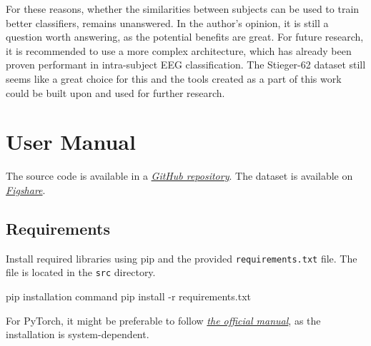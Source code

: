 \documentclass[english, he, bc, kiv, iso690alph, viewonly]{fasthesis}
\begin{document}
For these reasons, whether the similarities between subjects can be used to train better classifiers, remains unanswered. In the author's opinion, it is still a question worth answering, as the potential benefits are great. For future research, it is recommended to use a more complex architecture, which has already been proven performant in intra-subject EEG classification. The Stieger-62 dataset still seems like a great choice for this and the tools created as a part of this work could be built upon and used for further research.

\appendix
\chapter{User Manual}

The source code is available in a \href{https://github.com/radomirkesl/dleeg}{\textit{GitHub repository}}. The dataset is available on \href{https://figshare.com/articles/dataset/Human_EEG_Dataset_for_Brain-Computer_Interface_and_Meditation/13123148?file=25302482}{\textit{Figshare}}.

\section{Requirements}

Install required libraries using pip and the provided \texttt{requirements.txt} file. The file is located in the \texttt{src} directory.

\begin{console}{pip installation command}
pip install -r requirements.txt
\end{console}

For PyTorch, it might be preferable to follow \href{https://pytorch.org/get-started/locally/}{\textit{the official manual}}, as the installation is system-dependent.


\backmatter
\printbibliography
\listoffigures
\listoftables
\listoflistings

\setbackpageqrcode
\backpage
\end{document}

